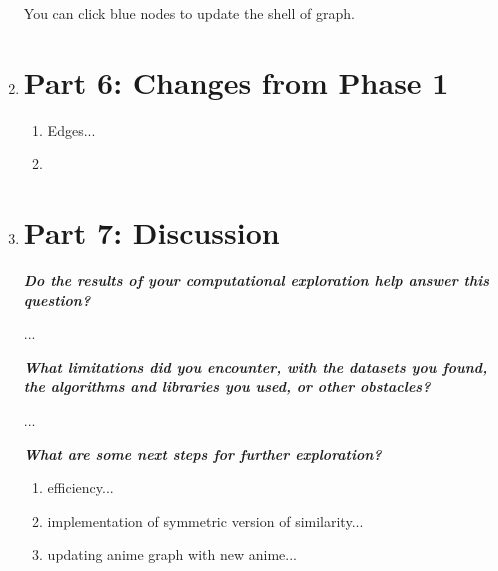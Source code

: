 \documentclass[12pt]{article}
\begin{document}
\begin{enumerate}
\begin{text}
You can click blue nodes to update the shell of graph.

\end{text}

\newpage

\item \section*{Part 6: Changes from Phase 1}

\begin{text}

\begin{enumerate}
    \item Edges...
    \item 
\end{enumerate}

\end{text}

\newpage

\item \section*{Part 7: Discussion}

\begin{text}


\emph{\textbf{Do the results of your computational exploration help answer this question?}}

...

\emph{\textbf{What limitations did you encounter, with the datasets you found, the algorithms and libraries you used, or other obstacles?}}

...

\emph{\textbf{What are some next steps for further exploration?}}

\begin{enumerate}
    \item efficiency...
    \item implementation of symmetric version of similarity...
    \item updating anime graph with new anime...
\end{enumerate}

\end{text}


\maketitle

\newpage




\end{enumerate}
\end{document}
